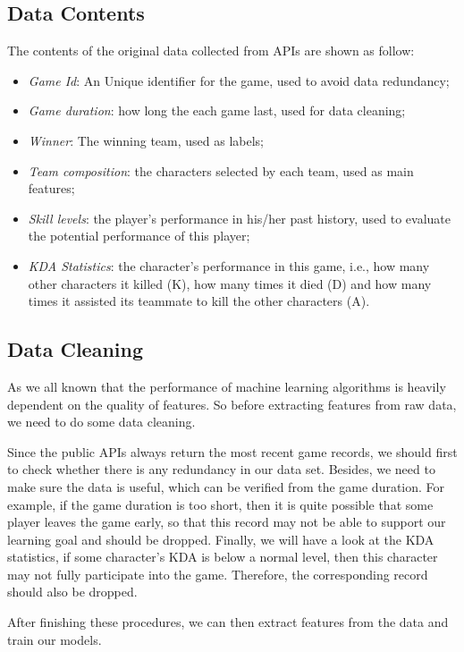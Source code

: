 \documentclass[conference]{IEEEtran}
\begin{document}
\subsection{Data Contents}

The contents of the original data collected from APIs are shown as follow:


\begin{itemize}
\item \textit{Game Id}: An Unique identifier for the game, used to avoid data redundancy;
\item \textit{Game duration}: how long the each game last, used for data cleaning;
\item \textit{Winner}: The winning team, used as labels;
\item \textit{Team composition}: the characters selected by each team, used as main features;
\item \textit{Skill levels}: the player's performance in his/her past history, used to evaluate the potential performance of this player;
\item \textit{KDA Statistics}: the character's performance in this game, i.e., how many other characters it killed (K), how many times it died (D) and how many times it assisted its teammate to kill the other characters (A).
\end{itemize}

\subsection{Data Cleaning}

As we all known that the performance of machine learning algorithms is heavily dependent on the quality of features. So before extracting features from raw data, we need to do some data cleaning.

Since the public APIs always return the most recent game records, we should first to check whether there is any redundancy in our data set. Besides, we need to make sure the data is useful, which can be verified from the game duration. For example, if the game duration is too short, then it is quite possible that some player leaves the game early, so that this record may not be able to support our learning goal and should be dropped. Finally, we will have a look at the KDA statistics, if some character's KDA is below a normal level, then this character may not fully participate into the game. Therefore, the corresponding record should also be dropped.

After finishing these procedures, we can then extract features from the data and train our models.
\end{document}
